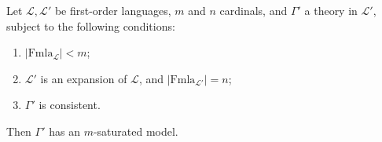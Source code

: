 \begin{theorem}[28.11]
\label{thm:existence-m-saturated-large-cardinal}
Let $\mathcal{L}, \mathcal{L}'$ be first-order languages, $m$ and $n$ cardinals, and $\Gamma'$ a theory in $\mathcal{L}'$, subject to the following conditions:
\begin{enumerate}
\item[(i)] $|\mathrm{Fmla}_{\mathcal{L}}| < m$;
\item[(ii)] $\mathcal{L}'$ is an expansion of $\mathcal{L}$, and $|\mathrm{Fmla}_{\mathcal{L}'}| = n$;
\item[(iii)] $\Gamma'$ is consistent.
\end{enumerate}
Then $\Gamma'$ has an $m$-saturated model.
\end{theorem}
